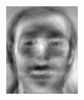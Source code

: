 \begin{frame}
\begin{columns}
\begin{overlayarea}{\textwidth}{\textheight}
{\begin{minipage}[t]{0.15\textwidth}
          \includegraphics[width=\textwidth]{images/eig_docked_image/eig_14.jpeg}
        \end{minipage}
        \begin{minipage}[t]{0.15\textwidth}

\end{minipage}}
\end{overlayarea}
\end{columns}
\end{frame}
